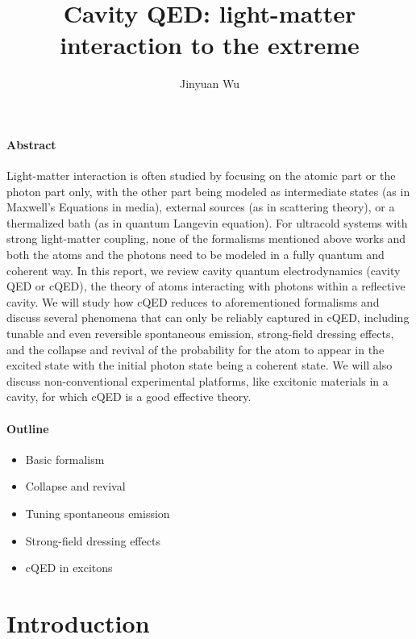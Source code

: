 \documentclass[hyperref, a4paper]{article}
\title{Cavity QED: light-matter interaction to the extreme}
\author{Jinyuan Wu}
\begin{document}
\maketitle

\paragraph*{Abstract} Light-matter interaction is often studied by focusing on  
the atomic part or the photon part only, 
with the other part being modeled as 
intermediate states (as in Maxwell's Equations in media), 
external sources (as in scattering theory), 
or a thermalized bath (as in quantum Langevin equation).
For ultracold systems with strong light-matter coupling,
none of the formalisms mentioned above works 
and both the atoms and the photons need to be modeled in a 
fully quantum and coherent way.
In this report, we review cavity quantum electrodynamics (cavity QED or cQED), 
the theory of atoms interacting with photons within a reflective cavity.
We will study how cQED reduces to aforementioned formalisms 
and discuss several phenomena that can only be reliably captured in cQED, 
including tunable and even reversible spontaneous emission, 
strong-field dressing effects, 
and the collapse and revival of the probability for the atom to appear in the excited state
with the initial photon state being a coherent state.
We will also discuss non-conventional experimental platforms, 
like excitonic materials in a cavity,
for which cQED is a good effective theory.

\paragraph*{Outline} 
\begin{itemize}
    \item Basic formalism \cite{bina2012coherent}
    \item Collapse and revival \cite{meystre2021quantum}
    \item Tuning spontaneous emission \cite{meystre2021quantum}
    \item Strong-field dressing effects \cite{di2016cutting}
    \item cQED in excitons \cite{latini2019cavity}
\end{itemize}

\section{Introduction}
\end{document}
